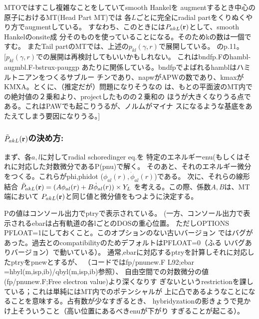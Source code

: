 \documentclass[a4paper,10pt,aip,onecolumn,amsmath,amssymb,floatfix,rmp]{revtex4-1}
\newcommand{\bfr}{{\bf r}}
\begin{document}
MTOではすこし複雑なことをしていてsmooth Hankelを
augmentするとき中心の原子におけるMT(Head Part MT)では
各$L$ごとに完全にradial partをくりぬくやり方でaugmentしている。
すなわち、このときには${P}_{akL}(\bfr)$として、smooth Hankelのonsite成
分そのものを使っていることになる。そのためkの数は一個ですむ。
またTail partのMTでは、上述の$p_{kl}(\gamma,r)$で展開している。
\cite{lmfchap}のp.11。\\


[$p_{kl}(\gamma,r)$での展開は再検討してもいいかもしれない。
これはbndfp.Fのhambl-augmbl.F-bstrux-pauggp
あたりに関係している。bndfpでよばれるhamblはハミルトニアンをつくるサブルー
チンであり、napwがAPWの数であり、kmaxがKMXA。とくに、（推定だが）問題になりそうなの
は、もとの平面波のMT内での絶対値の２乗和より、projectしたものの２乗和の
ほうが大きくなりうる点である。これはPAWでも起こりうるが、ノルムがマイナ
スになるような基底をあたえてしまう要因になりうる。]


\subsubsection{\bf $\tilde{P}_{akL} (\bfr)$の決め方:}
まず、各$a,l$に対してradial schoredinger eq.を
特定のエネルギーenu(もしくはそれに対応した対数微分であるP(pnu)で解く。
そのあと、それのエネルギー微分をつくる。これらがphi,phidot
($\phi_{al}(r),\dot{\phi}_{al}(r)$)である。
次に、それらの線形結合
$\tilde{P}_{akL}(\bfr)=(A\phi_{al}(r)+ B \dot{\phi}_{al}(r))\times Y_L$
を考える。この際、係数$A,B$は、MT端において
${P}_{akL}(\bfr)$と同じ値と微分値をもつように決定する。

Pの値はコンソール出力でptryで表示されている。
(一方、コンソール出力で表示されるebarは占有軌道の各lごとのDOSの重心位置。
ただしOPTIONS PFLOAT=1にしておくこと。このオプションのない古いバージョン
ではバグがあった。過去とのcompatibilityのためデフォルトはPFLOAT=0（ふる
いバグありバージョン）で動いている）。
通常,ebarに対応するptryを計算しそれに対応したptryをpnewとするが、
（コードではfp/pnunew.F L92;ebar =hbyl(m,isp,ib)/qbyl(m,isp,ib)参照）、
自由空間での対数微分の値(fp/pnunew.F;Free electron value)より深くなりす
ぎないというrestrictionを課している；これは単純にはMT内でのポテンシャルが
上に凸であるようなことになることを意味する。占有数が少なすぎるとき、
hybridyzationの影きょうで見かけ上そういうこと（高い位置にあるべきenuが下がり
すぎることが起こる）。

\end{document}
